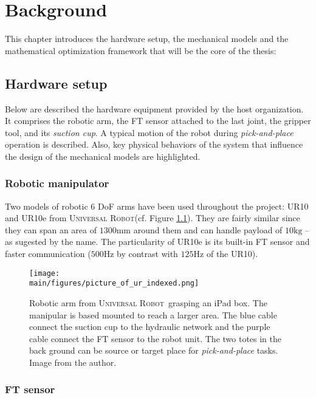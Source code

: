 \documentclass[/home/francois/latex/report/main.tex]{subfiles}
\begin{document}
\chapter{Background}
\label{chapter:background}

This chapter introduces the hardware setup, the mechanical models and the mathematical optimization framework that will be the core of the thesis:

\section{Hardware setup}
\label{section:hardware}

Below are described the hardware equipment provided by the host organization. It comprises the robotic arm, the \ac{FT} sensor attached to the last joint, the gripper tool, and its \textit{suction cup}. A typical motion of the robot during \textit{pick-and-place} operation is described. Also, key physical behaviors of the system that influence the design of the mechanical models are highlighted.

\subsection{Robotic manipulator}

Two models of robotic 6 \ac{DoF} arms have been used throughout the project: UR10 and UR10e from \textsc{Universal Robot}\texttrademark (cf. Figure \ref{fig:background:albert}). They are fairly similar since they can span an area of $1300 \si{\milli\meter}$ around them and can handle payload of $10 \si{\kilo\gram}$ –as sugested by the name. The particularity of UR10e is its built-in \ac{FT} sensor and faster communication ($500 \si{\hertz}$ by contrast with $125 \si{\hertz}$ of the UR10).

\begin{figure}[H]
  \centering
  \texttt{[image: \\main/figures/picture\_of\_ur\_indexed.png]}
  \caption{Robotic arm from \textsc{Universal Robot}\texttrademark \ grasping an iPad box. The manipular is based mounted to reach a larger area. The blue cable connect the suction cup to the hydraulic network and the purple cable connect the \ac{FT} sensor to the robot unit. The two totes in the back ground can be source or target place for \textit{pick-and-place} tasks. Image from the author.}
  \label{fig:background:albert}
\end{figure}

\subsection{\ac{FT} sensor}
\end{document}
